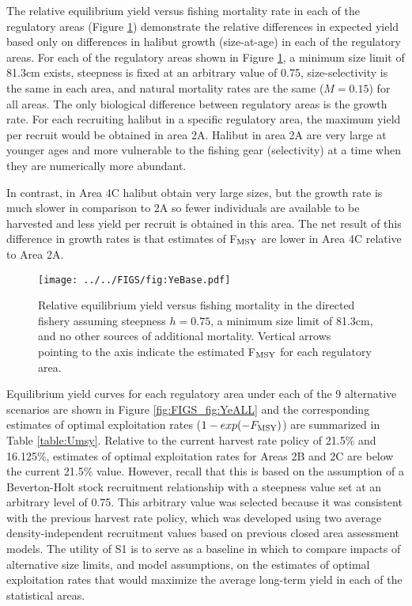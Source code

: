 The relative equilibrium yield versus fishing mortality rate in each of the regulatory areas  (Figure \ref{fig:FIGS_fig:YeBase}) demonstrate the relative differences in expected yield based only on differences in halibut growth (size-at-age) in each of the regulatory areas.  For each of the regulatory areas shown in Figure \ref{fig:FIGS_fig:YeBase}, a minimum size limit of 81.3cm exists, steepness is fixed at an arbitrary value of 0.75, size-selectivity is the same in each area, and natural mortality rates are the same ($M=0.15$) for all areas.  The only biological difference between regulatory areas is the growth rate.  For each recruiting halibut in a specific regulatory area, the maximum yield per recruit would be obtained in area 2A.  Halibut in area 2A are very large at younger ages and more vulnerable to the fishing gear (selectivity) at a time when they are numerically more abundant.

In contrast, in Area 4C halibut obtain very large sizes, but the growth rate is much slower in comparison to 2A so fewer individuals are available to be harvested and less yield per recruit is obtained in this area.  The net result of this difference in growth rates is that estimates of F$_{\rm{MSY}}$ are lower in Area 4C relative to Area 2A.


\begin{figure}[htbp]
	\centering
		\texttt{[image: ../../FIGS/fig:YeBase.pdf]}
	\caption{Relative equilibrium yield versus fishing mortality in the directed fishery assuming steepness $h=0.75$, a minimum size limit of 81.3cm, and no other sources of additional mortality. Vertical arrows pointing to the axis indicate the estimated F$_{\rm{MSY}}$ for each regulatory area.}
	\label{fig:FIGS_fig:YeBase}
\end{figure}

Equilibrium yield curves for each regulatory area under each of the 9 alternative scenarios are shown in Figure \ref{fig:FIGS_fig:YeALL} and the corresponding estimates of optimal exploitation rates ($1-exp(-F_{\rm{MSY}})$) are summarized in Table \ref{table:Umsy}.  Relative to the current harvest rate policy of 21.5\% and 16.125\%, estimates of optimal exploitation rates for Areas 2B and 2C are below the current 21.5\% value.   However, recall that this is based on the assumption of a Beverton-Holt stock recruitment relationship with a steepness value set at an arbitrary level of 0.75.  This arbitrary value was selected because it was consistent with the previous harvest rate policy, which was developed using two average density-independent recruitment values based on previous closed area assessment models.  The utility of S1 is to serve as a baseline in which to compare impacts of alternative size limits, and model assumptions,  on the estimates of optimal exploitation rates that would maximize the average long-term yield in each of the statistical areas.


